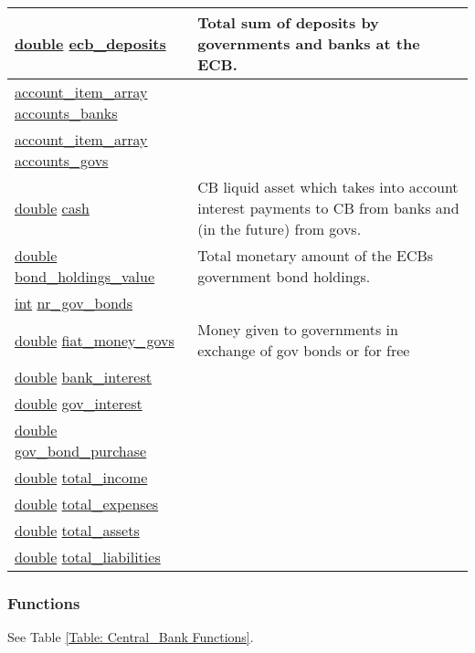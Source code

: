 \documentclass[a4paper,11pt]{article}
\begin{document}
\begin{landscape}
\begin{longtable}[H!]{ll}
\midrule
\url{double} \url{ecb_deposits} & \parbox{10cm}{Total sum of deposits by governments and banks at the ECB.} \\
\midrule
\url{account_item_array} \url{accounts_banks} & \parbox{10cm}{} \\
\midrule
\url{account_item_array} \url{accounts_govs} & \parbox{10cm}{} \\
\midrule
\url{double} \url{cash} & \parbox{10cm}{CB liquid asset which takes into account interest payments to CB from banks and (in the future) from govs.} \\
\midrule
\url{double} \url{bond_holdings_value} & \parbox{10cm}{Total monetary amount of the ECBs government bond holdings.} \\
\midrule
\url{int} \url{nr_gov_bonds} & \parbox{10cm}{} \\
\midrule
\url{double} \url{fiat_money_govs} & \parbox{10cm}{Money given to governments in exchange of gov bonds or for free} \\
\midrule
\url{double} \url{bank_interest} & \parbox{10cm}{} \\
\midrule
\url{double} \url{gov_interest} & \parbox{10cm}{} \\
\midrule
\url{double} \url{gov_bond_purchase} & \parbox{10cm}{} \\
\midrule
\url{double} \url{total_income} & \parbox{10cm}{} \\
\midrule
\url{double} \url{total_expenses} & \parbox{10cm}{} \\
\midrule
\url{double} \url{total_assets} & \parbox{10cm}{} \\
\midrule
\url{double} \url{total_liabilities} & \parbox{10cm}{} \\
\end{longtable}
\end{landscape}

\subsubsection{Functions}
See Table \ref{Table: Central_Bank Functions}.
\end{document}
